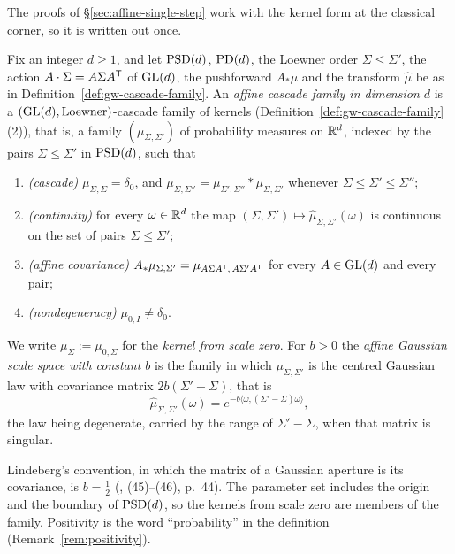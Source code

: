 The proofs of \S\ref{sec:affine-single-step} work with the kernel form at the classical corner, so
it is written out once.

\begin{definition}\label{def:affine-cascade-family}
Fix an integer $d \ge 1$, and let $\mathrm{PSD}(d)$, $\mathrm{PD}(d)$, the Loewner order $\Sigma \le \Sigma'$, the
action $A \cdot \Sigma = A\Sigma A^{\mathsf{T}}$ of $\mathrm{GL}(d)$, the pushforward $A_*\mu$ and the transform
$\widehat\mu$ be as in Definition~\ref{def:gw-cascade-family}. An \emph{affine cascade family in dimension
$d$} is a $(\mathrm{GL}(d), \text{Loewner})$-cascade family of kernels (Definition~\ref{def:gw-cascade-family}(2)),
that is, a family $(\mu_{\Sigma,\Sigma'})$ of probability measures on $\mathbb{R}^d$, indexed by the pairs
$\Sigma \le \Sigma'$ in $\mathrm{PSD}(d)$, such that
\begin{enumerate}
\item[(K1)] \emph{(cascade)} $\mu_{\Sigma,\Sigma} = \delta_0$, and
$\mu_{\Sigma,\Sigma''} = \mu_{\Sigma',\Sigma''} * \mu_{\Sigma,\Sigma'}$ whenever
$\Sigma \le \Sigma' \le \Sigma''$;
\item[(K2)] \emph{(continuity)} for every $\omega \in \mathbb{R}^d$ the map
$(\Sigma,\Sigma') \mapsto \widehat\mu_{\Sigma,\Sigma'}(\omega)$ is continuous on the set of
pairs $\Sigma \le \Sigma'$;
\item[(K3)] \emph{(affine covariance)} $A_*\mu_{\Sigma,\Sigma'} = \mu_{A\Sigma A^{\mathsf{T}},\,A\Sigma'A^{\mathsf{T}}}$
for every $A \in \mathrm{GL}(d)$ and every pair;
\item[(K4)] \emph{(nondegeneracy)} $\mu_{0,I} \ne \delta_0$.
\end{enumerate}
We write $\mu_\Sigma := \mu_{0,\Sigma}$ for the \emph{kernel from scale zero}. For $b > 0$ the
\emph{affine Gaussian scale space with constant $b$} is the family in which $\mu_{\Sigma,\Sigma'}$
is the centred Gaussian law with covariance matrix $2b(\Sigma' - \Sigma)$, that is
\begin{equation}\label{eq:affine-gaussian}
  \widehat\mu_{\Sigma,\Sigma'}(\omega) = e^{-b\langle\omega,(\Sigma'-\Sigma)\omega\rangle} ,
\end{equation}
the law being degenerate, carried by the range of $\Sigma' - \Sigma$, when that matrix is singular.
\end{definition}

Lindeberg's convention, in which the matrix of a Gaussian aperture is its covariance, is
$b = \tfrac12$ (, (45)--(46), p.~44). The parameter set includes the origin and the
boundary of $\mathrm{PSD}(d)$, so the kernels from scale zero are members of the family. Positivity is the
word ``probability'' in the definition (Remark~\ref{rem:positivity}).

